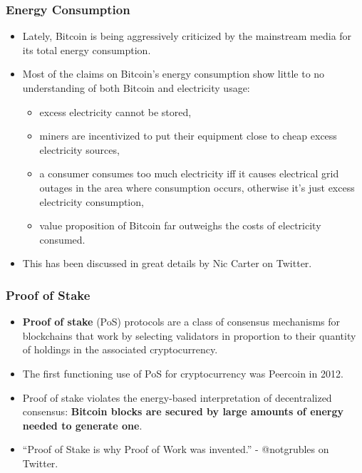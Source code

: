 \documentclass{beamer}
\begin{document}
\begin{frame}
  \frametitle{Energy Consumption}
  \begin{itemize}
  \item Lately, Bitcoin is being aggressively criticized by the mainstream
    media for its total energy consumption.
  \item Most of the claims on Bitcoin's energy consumption show little to no
    understanding of both Bitcoin and electricity usage:
    \begin{itemize}
    \item excess electricity cannot be stored,
    \item miners are incentivized to put their equipment close to cheap excess
      electricity sources,
    \item a consumer consumes too much electricity iff it causes electrical grid
      outages in the area where consumption occurs, otherwise it's just excess
      electricity consumption,
    \item value proposition of Bitcoin far outweighs the costs of electricity
      consumed.
    \end{itemize}
  \item This has been discussed in great details by Nic Carter on Twitter.
  \end{itemize}
\end{frame}

\begin{frame}
  \frametitle{Proof of Stake}
  \begin{itemize}
  \item \textbf{Proof of stake} (PoS) protocols are a class of consensus
    mechanisms for blockchains that work by selecting validators in proportion
    to their quantity of holdings in the associated cryptocurrency.
  \item The first functioning use of PoS for cryptocurrency was Peercoin in
    2012.
  \item Proof of stake violates the energy-based interpretation of decentralized
    consensus: \textbf{Bitcoin blocks are secured by large amounts of energy
      needed to generate one}.
  \item ``Proof of Stake is why Proof of Work was invented.'' - @notgrubles on
    Twitter.
  \end{itemize}
\end{frame}
\end{document}
